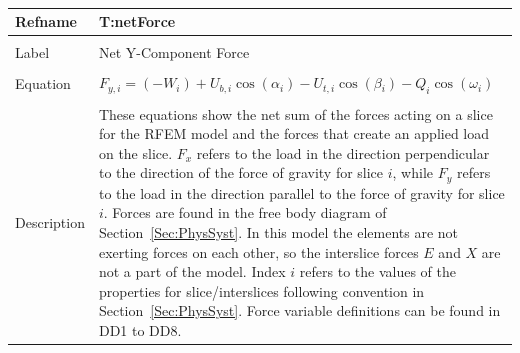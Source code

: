 \documentclass[12pt]{article}
\begin{document}
~\newline
\noindent \begin{minipage}{\textwidth}
\begin{tabular}{p{} p{}}
\toprule \textbf{Refname} & \textbf{T:netForce}
\label{T:netForce}
\\ \midrule \\
Label & Net Y-Component Force
\\ \midrule \\
Equation & ${F_{y,i}}=\left(-W_{i}\right)+{U_{b,i}} \cos\left(\alpha{}_{i}\right)-{U_{t,i}} \cos\left(\beta{}_{i}\right)-Q_{i} \cos\left(\omega{}_{i}\right)$
\\ \midrule \\
Description & These equations show the net sum of the forces acting on a slice for the RFEM model and the forces that create an applied load on the slice. ${F_{x}}$ refers to the load in the direction perpendicular to the direction of the force of gravity for slice $i$, while ${F_{y}}$ refers to the load in the direction parallel to the force of gravity for slice $i$. Forces are found in the free body diagram of Section~\ref{Sec:PhysSyst}. In this model the elements are not exerting forces on each other, so the interslice forces $E$ and $X$ are not a part of the model. Index $i$ refers to the values of the properties for slice/interslices following convention in Section~\ref{Sec:PhysSyst}. Force variable definitions can be found in DD1 to DD8.
\\ \bottomrule \end{tabular}
\end{minipage}\\
~\newline
\end{document}
